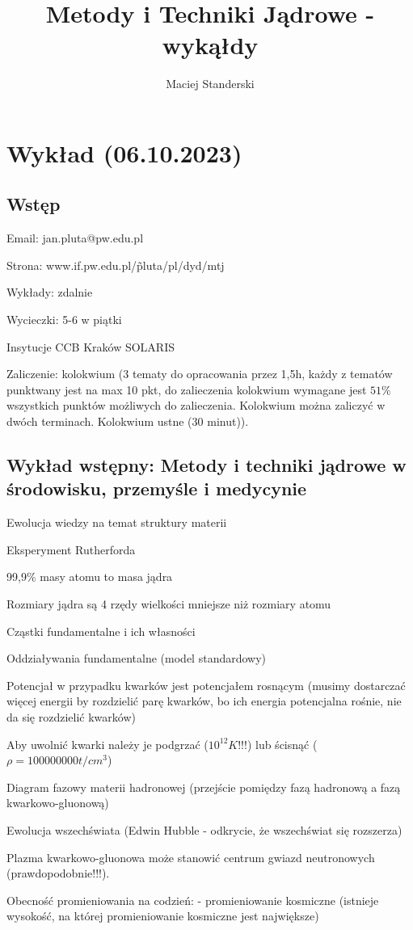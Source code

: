 \documentclass{article}
\title{Metody i Techniki Jądrowe - wykąłdy}
\author{Maciej Standerski}
\begin{document}
\maketitle

\section{Wykład (06.10.2023)}

\subsection{Wstęp}

Email: jan.pluta@pw.edu.pl

Strona: www.if.pw.edu.pl/\~pluta/pl/dyd/mtj

Wykłady: zdalnie

Wycieczki: 5-6 w piątki

Insytucje
CCB Kraków
SOLARIS

Zaliczenie: kolokwium (3 tematy do opracowania przez 1,5h, każdy z tematów punktwany jest na max 10 pkt, do zalieczenia kolokwium wymagane jest $51\%$ wszystkich punktów możliwych do zalieczenia. Kolokwium można zaliczyć w dwóch terminach. Kolokwium ustne (30 minut)).

\subsection{Wykład wstępny: Metody i techniki jądrowe w środowisku, przemyśle i medycynie}

Ewolucja wiedzy na temat struktury materii

Eksperyment Rutherforda

99,9\% masy atomu to masa jądra

Rozmiary jądra są 4 rzędy wielkości mniejsze niż rozmiary atomu

Cząstki fundamentalne i ich własności

Oddziaływania fundamentalne (model standardowy)

Potencjał w przypadku kwarków jest potencjałem rosnącym (musimy dostarczać więcej energii by rozdzielić parę kwarków, bo ich energia potencjalna rośnie, nie da się rozdzielić kwarków)

Aby uwolnić kwarki należy je podgrzać ($10^{12} K$!!!) lub ścisnąć ($\rho = 100 000 000 t/cm^3$)

Diagram fazowy materii hadronowej (przejście pomiędzy fazą hadronową a fazą kwarkowo-gluonową)

Ewolucja wszechświata
(Edwin Hubble - odkrycie, że wszechświat się rozszerza)

Plazma kwarkowo-gluonowa może stanowić centrum gwiazd neutronowych (prawdopodobnie!!!).

Obecność promieniowania na codzień:
- promieniowanie kosmiczne (istnieje wysokość, na której promieniowanie kosmiczne jest największe)
\end{document}
